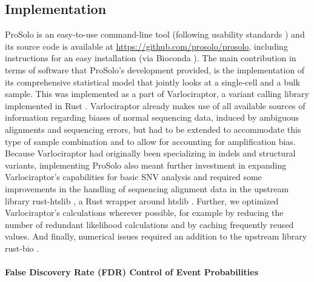 \documentclass[authoryear,preprint,11pt]{scrartcl}
\begin{document}
\subsection{Implementation} \label{sec:implementation}

ProSolo is an easy-to-use command-line tool (following usability standards \citep{taschuk_ten_2017}) and its source code is available at \url{https://github.com/prosolo/prosolo}, including instructions for an easy installation (via Bioconda \citep{gruning_bioconda:_2018}). 
The main contribution in terms of software that ProSolo's development provided, is the implementation of its comprehensive statistical model that jointly looks at a single-cell and a bulk sample.
This was implemented as a part of Varlociraptor, a variant calling library implemented in Rust \citep{koster_varlociraptor_2020}.
Varlociraptor already makes use of all available sources of information regarding biases of normal sequencing data, induced by ambiguous alignments and sequencing errors, but had to be extended to accommodate this type of sample combination and to allow for accounting for amplification bias.
Because Varlociraptor had originally been specializing in indels and structural variants, implementing ProSolo also meant further investment in expanding Varlociraptor's capabilities for basic SNV analysis and required some improvements in the handling of sequencing alignment data in the upstream library rust-htslib \citep{rust-htslib_htslib_nodate}, a Rust wrapper around htslib \citep{htslib_c_nodate}. 
Further, we optimized Varlociraptor's calculations wherever possible, for example by reducing the number of redundant likelihood calculations and by caching frequently reused values.
And finally, numerical issues required an addition to the upstream library rust-bio \citep{koster_rust-bio:_2016}. 

\paragraph{False Discovery Rate (FDR) Control of Event Probabilities} \label{sec:fdr}
\end{document}
